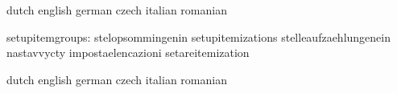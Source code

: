 \stopcommands



\startcommands                    dutch                            english
                                  german                           czech
                                  italian                          romanian


                 setupitemgroups: stelopsommingenin                setupitemizations
                                  stelleaufzaehlungenein           nastavvycty
                                  impostaelencazioni               setareitemization

\stopcommands




\startcommands                    dutch                            english
                                  german                           czech
                                  italian                          romanian

